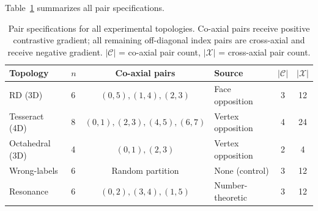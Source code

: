 Table~\ref{tab:topology_specs} summarizes all pair specifications.

\begin{table}[H]
\centering
\caption{Pair specifications for all experimental topologies. Co-axial
  pairs receive positive contrastive gradient; all remaining
  off-diagonal index pairs are cross-axial and receive negative
  gradient. $|\mathcal{C}|$ = co-axial pair count,
  $|\mathcal{X}|$ = cross-axial pair count.}
\label{tab:topology_specs}
\small
\begin{tabular}{llclcc}
\toprule
Topology & $n$ & Co-axial pairs & Source & $|\mathcal{C}|$ & $|\mathcal{X}|$ \\
\midrule
RD (3D) & 6 & $(0,5), (1,4), (2,3)$ & Face opposition & 3 & 12 \\
Tesseract (4D) & 8 & $(0,1), (2,3), (4,5), (6,7)$ & Vertex opposition & 4 & 24 \\
Octahedral (3D) & 4 & $(0,1), (2,3)$ & Vertex opposition & 2 & 4 \\
Wrong-labels & 6 & Random partition & None (control) & 3 & 12 \\
Resonance & 6 & $(0,2), (3,4), (1,5)$ & Number-theoretic & 3 & 12 \\
\bottomrule
\end{tabular}
\end{table}
